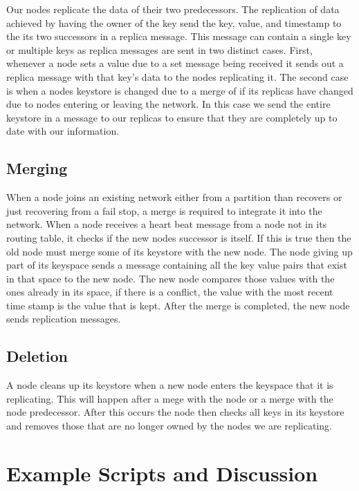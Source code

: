 \documentclass[11pt]{article}
\begin{document}
Our nodes replicate the data of their two predecessors. The replication of data achieved by having the owner of the key send the key, value, and timestamp to the its two successors in a replica message. This message can contain a single key or multiple keys as replica messages are sent in two distinct cases. First, whenever a node sets a value due to a set message being received it sends out a replica message with that key's data to the nodes replicating it. The second case is when a nodes keystore is changed due to a merge of if its replicas have changed due to nodes entering or leaving the network. In this case we send the entire keystore in a message to our replicas to ensure that they are completely up to date with our information.

\subsection{Merging}\label{sec:Merg}

When a node joins an existing network either from a partition than recovers or just recovering from a fail stop, a merge is required to integrate it into the network. When a node receives a heart beat message from a node not in its routing table, it checks if the new nodes successor is itself. If this is true then the old node must merge some of its keystore with the new node. The node giving up part of its keyspace sends a message containing all the key value pairs that exist in that space to the new node. The new node compares those values with the ones already in its space, if there is a conflict, the value with the most recent time stamp is the value that is kept. After the merge is completed, the new node sends replication messages.

\subsection{Deletion}\label{sec:Del}

A node cleans up its keystore when a new node enters the keyspace that it is replicating. This will happen after a mege with the node or a merge with the node predecessor. After this occurs the node then checks all keys in its keystore and removes those that are no longer owned by the nodes we are replicating.

\section{Example Scripts and Discussion}\label{sec:Ex}
\end{document}
